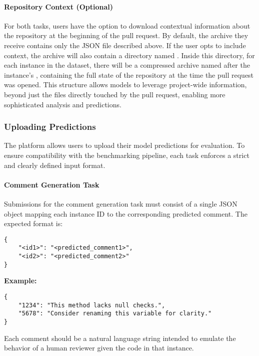 \paragraph{Repository Context (Optional)}

For both tasks, users have the option to download contextual information about the repository at the
beginning of the pull request. By default, the archive they receive contains only the JSON file
described above. If the user opts to include context, the archive will also contain a directory
named . Inside this directory, for each instance in the dataset, there will be a
compressed archive named after the instance's , containing the full state of the repository
at the time the pull request was opened. This structure allows models to leverage project-wide
information, beyond just the files directly touched by the pull request, enabling more sophisticated
analysis and predictions.


\subsubsection{Uploading Predictions}
\label{sec:upload}

The platform allows users to upload their model predictions for evaluation. To ensure compatibility
with the benchmarking pipeline, each task enforces a strict and clearly defined input format.

\paragraph{Comment Generation Task}

Submissions for the comment generation task must consist of a single JSON object mapping each
instance ID to the corresponding predicted comment. The expected format is:

\begin{verbatim}
{
    "<id1>": "<predicted_comment1>",
    "<id2>": "<predicted_comment2>"
}
\end{verbatim}

\noindent
\textbf{Example:}

\begin{verbatim}
{
    "1234": "This method lacks null checks.",
    "5678": "Consider renaming this variable for clarity."
}
\end{verbatim}

Each comment should be a natural language string intended to emulate the behavior of a human
reviewer given the code in that instance.

